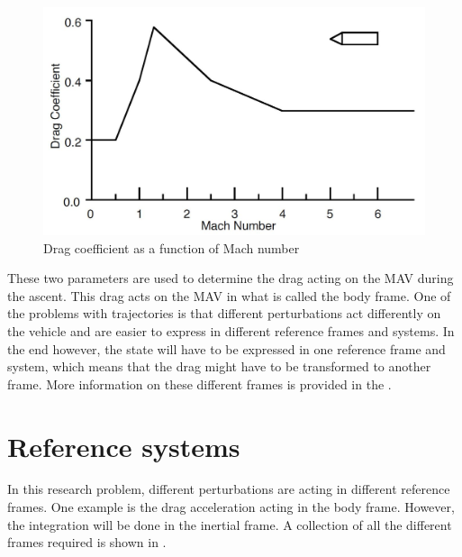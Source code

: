 \begin{figure}[!ht]
\centering
\includegraphics[width=1.0\textwidth]{figures/launcher_methods/dragcoeff_whitehead2004mars.jpg}
\caption{Drag coefficient as a function of Mach number \cite{whitehead2004mars}}
\label{fig:dragcoeff_whitehead2004mars}
\end{figure}

These two parameters are used to determine the drag acting on the \ac{MAV} during the ascent. This drag acts on the \ac{MAV} in what is called the body frame. One of the problems with trajectories is that different perturbations act differently on the vehicle and are easier to express in different reference frames and systems. In the end however, the state will have to be expressed in one reference frame and system, which means that the drag might have to be transformed to another frame. More information on these different frames is provided in the .




\section{Reference systems}
\label{sec:referenceSystems}
In this research problem, different perturbations are acting in different reference frames. One example is the drag acceleration acting in the body frame. However, the integration will be done in the inertial frame. A collection of all the different frames required is shown in .



